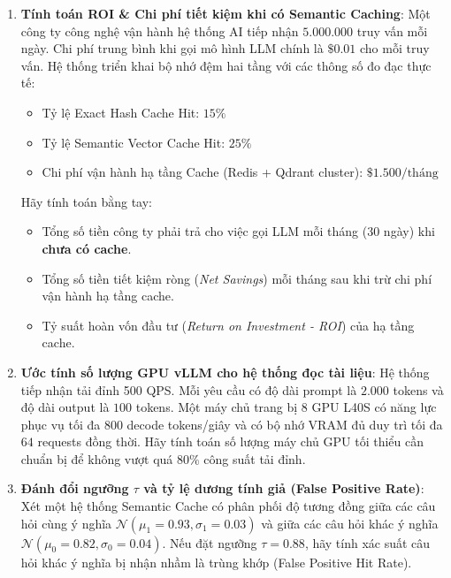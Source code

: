\begin{enumerate}[label=\textbf{B\arabic*.}]
  \item \textbf{Tính toán ROI \& Chi phí tiết kiệm khi có Semantic Caching}:
  Một công ty công nghệ vận hành hệ thống AI tiếp nhận $5.000.000$ truy vấn mỗi ngày.
  Chi phí trung bình khi gọi mô hình LLM chính là $\$0.01$ cho mỗi truy vấn.
  Hệ thống triển khai bộ nhớ đệm hai tầng với các thông số đo đạc thực tế:
  \begin{itemize}
    \item Tỷ lệ Exact Hash Cache Hit: $15\%$
    \item Tỷ lệ Semantic Vector Cache Hit: $25\%$
    \item Chi phí vận hành hạ tầng Cache (Redis + Qdrant cluster): $\$1.500\text{/tháng}$
  \end{itemize}
  Hãy tính toán bằng tay:
  \begin{itemize}
    \item[a)] Tổng số tiền công ty phải trả cho việc gọi LLM mỗi tháng (30 ngày) khi \textbf{chưa có cache}.
    \item[b)] Tổng số tiền tiết kiệm ròng (\textit{Net Savings}) mỗi tháng sau khi trừ chi phí vận hành hạ tầng cache.
    \item[c)] Tỷ suất hoàn vốn đầu tư (\textit{Return on Investment - ROI}) của hạ tầng cache.
  \end{itemize}

  \item \textbf{Ước tính số lượng GPU vLLM cho hệ thống đọc tài liệu}:
  Hệ thống tiếp nhận tải đỉnh 500 QPS. Mỗi yêu cầu có độ dài prompt là $2.000$ tokens và độ dài output là $100$ tokens.
  Một máy chủ trang bị 8 GPU L40S có năng lực phục vụ tối đa $800$ decode tokens/giây và có bộ nhớ VRAM đủ duy trì tối đa $64$ requests đồng thời.
  Hãy tính toán số lượng máy chủ GPU tối thiểu cần chuẩn bị để không vượt quá $80\%$ công suất tải đỉnh.

  \item \textbf{Đánh đổi ngưỡng $\tau$ và tỷ lệ dương tính giả (False Positive Rate)}:
  Xét một hệ thống Semantic Cache có phân phối độ tương đồng giữa các câu hỏi cùng ý nghĩa $\mathcal{N}(\mu_1 = 0.93, \sigma_1 = 0.03)$ và giữa các câu hỏi khác ý nghĩa $\mathcal{N}(\mu_0 = 0.82, \sigma_0 = 0.04)$. Nếu đặt ngưỡng $\tau = 0.88$, hãy tính xác suất câu hỏi khác ý nghĩa bị nhận nhầm là trùng khớp (False Positive Hit Rate).


\end{enumerate}
